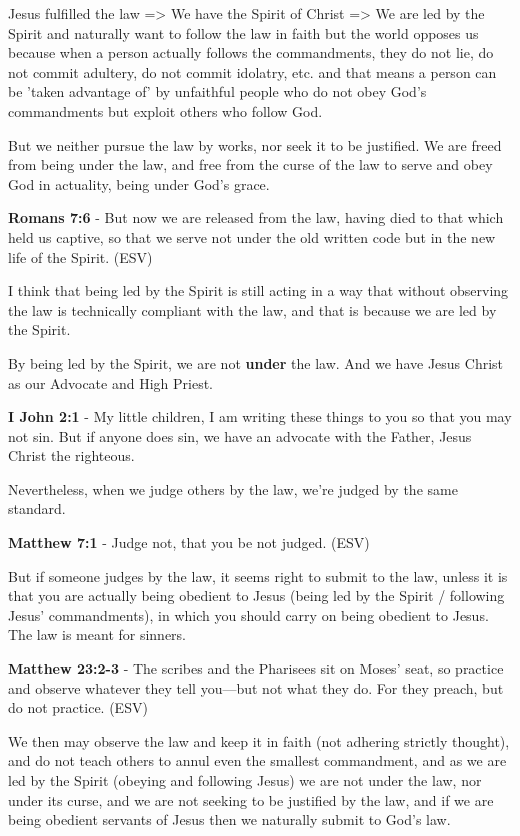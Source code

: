 \documentclass[11pt]{article}
\begin{document}
Jesus fulfilled the law => We have the Spirit of Christ => We are led by the Spirit and naturally want to follow the law in faith but the world opposes us because when a person actually follows the commandments, they do not lie, do not commit adultery, do not commit idolatry, etc. and that means a person can be 'taken advantage of' by unfaithful people who do not obey God's commandments but exploit others who follow God.

But we neither pursue the law by works, nor seek it to be justified.
We are freed from being under the law, and free from the curse of the law to serve and obey God in actuality, being under God's grace.

\textbf{Romans 7:6} - But now we are released from the law, having died to that which held us captive, so that we serve not under the old written code but in the new life of the Spirit. (ESV)

I think that being led by the Spirit is still acting in a way that without observing the law is technically compliant with the law, and that is because we are led by the Spirit.

By being led by the Spirit, we are not \textbf{under} the law. And we have Jesus Christ as our Advocate and High Priest.

\textbf{I John 2:1} - My little children, I am writing these things to you so that you may not sin. But if anyone does sin, we have an advocate with the Father, Jesus Christ the righteous.

Nevertheless, when we judge others by the law, we're judged by the same standard.

\textbf{Matthew 7:1} - Judge not, that you be not judged. (ESV)

But if someone judges by the law, it seems right to submit to the law, unless it is that you are actually being obedient to Jesus (being led by the Spirit / following Jesus' commandments), in which you should carry on being obedient to Jesus. The law is meant for sinners.

\textbf{Matthew 23:2-3} - The scribes and the Pharisees sit on Moses' seat, so practice and observe whatever they tell you—but not what they do. For they preach, but do not practice. (ESV)

We then may observe the law and keep it in faith (not adhering strictly thought), and do not teach others to annul even the smallest commandment, and as we are led by the Spirit (obeying and following Jesus) we are not under the law, nor under its curse, and we are not seeking to be justified by the law, and if we are being obedient servants of Jesus then we naturally submit to God's law.
\end{document}
